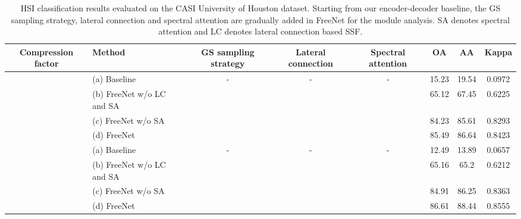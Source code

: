 \documentclass[journal]{IEEEtran}
\begin{document}
\begin{table*}[ht]
  \caption{
    HSI classification results evaluated on the CASI University of Houston dataset. Starting from our encoder-decoder baseline, the GS sampling strategy, lateral connection and spectral attention are gradually added in FreeNet for the module analysis.
    SA denotes spectral attention and LC denotes lateral connection based SSF.
    \label{tab:ablation_study}}
  \centering
  \renewcommand{\arraystretch}{1.5}
  \begin{tabular}{c|l|ccc|ccc}
    \hline
    Compression factor            & Method                    & GS sampling strategy & Lateral connection & Spectral attention & OA    & AA    & Kappa  \\ \hline
    \multirow{4}{*}{} & (a) Baseline              & -                        & -                  & -                  & 15.23 & 19.54 & 0.0972 \\ \cline{2-8}
                                  & (b) FreeNet w/o LC and SA &              &                    &                    & 65.12 & 67.45 & 0.6225 \\
                                  & (c) FreeNet w/o SA        &              &        &                    & 84.23 & 85.61 & 0.8293 \\
                                  & (d) FreeNet               &              &        &        & 85.49 & 86.64 & 0.8423 \\ \hline
    \multirow{4}{*}{}  & (a) Baseline              & -                        & -                  & -                  & 12.49 & 13.89 & 0.0657 \\ \cline{2-8}
                                  & (b) FreeNet w/o LC and SA &              &                    &                    & 65.16 & 65.2  & 0.6212 \\
                                  & (c) FreeNet w/o SA        &              &        &                    & 84.91 & 86.25 & 0.8363 \\
                                  & (d) FreeNet               &              &        &        & 86.61 & 88.44 & 0.8555 \\ \hline
  \end{tabular}
\end{table*}
\end{document}
